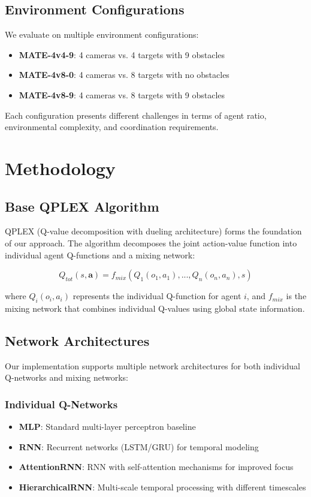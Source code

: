 \documentclass[conference]{IEEEtran}
\begin{document}
\subsection{Environment Configurations}
We evaluate on multiple environment configurations:
\begin{itemize}
\item \textbf{MATE-4v4-9}: 4 cameras vs. 4 targets with 9 obstacles
\item \textbf{MATE-4v8-0}: 4 cameras vs. 8 targets with no obstacles  
\item \textbf{MATE-4v8-9}: 4 cameras vs. 8 targets with 9 obstacles
\end{itemize}

Each configuration presents different challenges in terms of agent ratio, environmental complexity, and coordination requirements.

\section{Methodology}

\subsection{Base QPLEX Algorithm}
QPLEX (Q-value decomposition with dueling architecture) forms the foundation of our approach. The algorithm decomposes the joint action-value function into individual agent Q-functions and a mixing network:

$$Q_{tot}(s, \mathbf{a}) = f_{mix}(Q_1(o_1, a_1), ..., Q_n(o_n, a_n), s)$$

where $Q_i(o_i, a_i)$ represents the individual Q-function for agent $i$, and $f_{mix}$ is the mixing network that combines individual Q-values using global state information.

\subsection{Network Architectures}
Our implementation supports multiple network architectures for both individual Q-networks and mixing networks:

\subsubsection{Individual Q-Networks}
\begin{itemize}
\item \textbf{MLP}: Standard multi-layer perceptron baseline
\item \textbf{RNN}: Recurrent networks (LSTM/GRU) for temporal modeling
\item \textbf{AttentionRNN}: RNN with self-attention mechanisms for improved focus
\item \textbf{HierarchicalRNN}: Multi-scale temporal processing with different timescales
\end{itemize}
\end{document}
